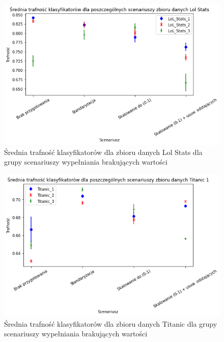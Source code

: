 \documentclass{book}
\begin{document}
\begin{figure}[H]
    \centerline{\includegraphics[scale=0.5]{Lol_Stats_Avg_Standaryzacja}}
    \centering
    \caption{Średnia trafność klasyfikatorów dla zbioru danych Lol Stats 
    dla grupy scenariuszy wypełniania brakujących wartości}
    \end{figure}

\begin{figure}[H]
    \centerline{\includegraphics[scale=0.5]{Titanic_Avg_Standaryzacja}}
    \centering
    \caption{Średnia trafność klasyfikatorów dla zbioru danych Titanic 
    dla grupy scenariuszy wypełniania brakujących wartości}
    \end{figure}
\end{document}
